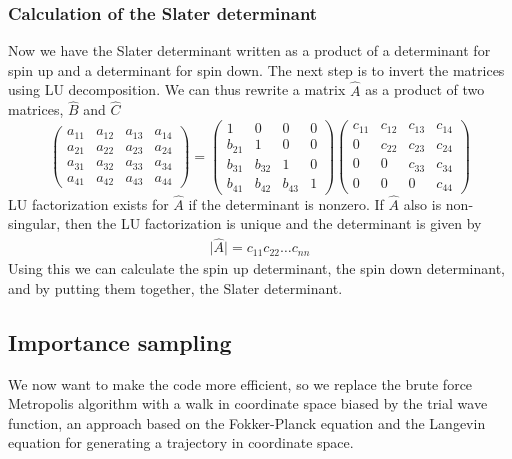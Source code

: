 \documentclass[11pt]{article}
\begin{document}
		\subsubsection{Calculation of the Slater determinant}
			Now we have the Slater determinant written as a product of a determinant
			for spin up and a determinant for spin down. The next step is to invert
			the matrices using LU decomposition. We can thus rewrite a matrix
			$\hat{A}$ as a product of two matrices, $\hat{B}$ and $\hat{C}$
			\[
			\left(\begin{array}{cccc}
			a_{11} & a_{12} & a_{13} & a_{14}\\
			a_{21} & a_{22} & a_{23} & a_{24}\\
			a_{31} & a_{32} & a_{33} & a_{34}\\
			a_{41} & a_{42} & a_{43} & a_{44}
			\end{array}\right)=\left(\begin{array}{cccc}
			1 & 0 & 0 & 0\\
			b_{21} & 1 & 0 & 0\\
			b_{31} & b_{32} & 1 & 0\\
			b_{41} & b_{42} & b_{43} & 1
			\end{array}\right)\left(\begin{array}{cccc}
			c_{11} & c_{12} & c_{13} & c_{14}\\
			0 & c_{22} & c_{23} & c_{24}\\
			0 & 0 & c_{33} & c_{34}\\
			0 & 0 & 0 & c_{44}
			\end{array}\right)
			\]
			LU factorization exists for $\hat{A}$ if the determinant is nonzero.
			If $\hat{A}$ also is non-singular, then the LU factorization is unique
			and the determinant is given by
			\begin{align}
				\vert\hat{A}\vert=c_{11}c_{22}\dots c_{nn}
			\end{align}
			Using this we can calculate the spin up determinant, the spin down
			determinant, and by putting them together, the Slater determinant.

	\subsection{Importance sampling}
		We now want to make the code more efficient, so we replace the brute
		force Metropolis algorithm with a walk in coordinate space biased
		by the trial wave function, an approach based on the Fokker-Planck
		equation and the Langevin equation for generating a trajectory in
		coordinate space.
\end{document}
